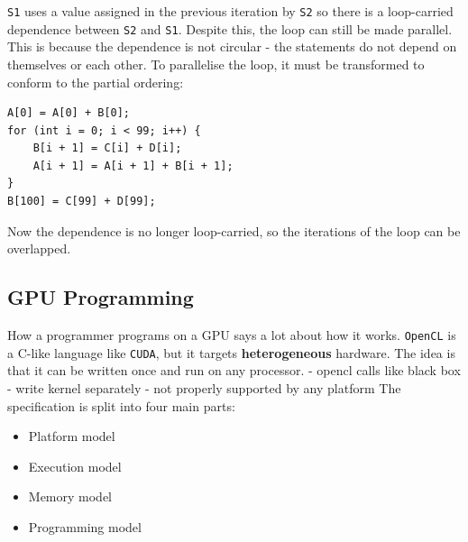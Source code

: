 \documentclass[11pt]{article}
\begin{document}
\texttt{S1} uses a value assigned in the previous iteration by \texttt{S2} so there is a loop-carried dependence between \texttt{S2} and \texttt{S1}. Despite this, the loop can still be made parallel. This is because the dependence is not circular - the statements do not depend on themselves or each other. To parallelise the loop, it must be transformed to conform to the partial ordering:
\begin{lstlisting}
A[0] = A[0] + B[0];
for (int i = 0; i < 99; i++) {
	B[i + 1] = C[i] + D[i];
	A[i + 1] = A[i + 1] + B[i + 1];
}
B[100] = C[99] + D[99];
\end{lstlisting}
Now the dependence is no longer loop-carried, so the iterations of the loop can be overlapped. 

\subsection{GPU Programming}
How a programmer programs on a GPU says a lot about how it works. \texttt{OpenCL} is a C-like language like \texttt{CUDA}, but it targets \textbf{heterogeneous} hardware. The idea is that it can be written once and run on any processor. 
\n
- opencl calls like black box
- write kernel separately
- not properly supported by any platform
\n
The specification is split into four main parts:
\begin{itemize}
\item Platform model
\item Execution model
\item Memory model
\item Programming model
\end{itemize}
\end{document}
